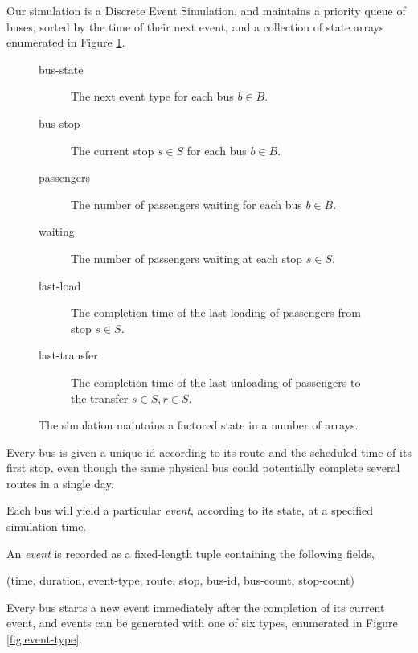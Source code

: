 \documentclass[12pt]{article}
\theoremstyle{definition}
\begin{document}
Our simulation is a Discrete Event Simulation, and maintains a priority queue
of buses, sorted by the time of their next event, and a collection of state
arrays enumerated in Figure \ref{fig:state}.

\begin{figure}
\caption{The simulation maintains a factored state in a number of arrays.}
\begin{description}
    \item[\ttfamily bus-state] The next event type for each bus $b \in B$.
    \item[\ttfamily bus-stop] The current stop $s \in S$ for each bus $b \in
        B$.
    \item[\ttfamily passengers] The number of passengers waiting
        for each bus $b \in B$.

    \item[\ttfamily waiting] The number of passengers waiting at each stop $s
        \in S$.

    \item[\ttfamily last-load] The completion time of the last loading of
        passengers from stop $s \in S$.

    \item[\ttfamily last-transfer] The completion time of the last unloading
        of passengers to the transfer $s \in S, r \in S$.
\end{description}
\label{fig:state}
\end{figure}

Every bus is given a unique id according to its route and the scheduled time
of its first stop, even though the same physical bus could potentially
complete several routes in a single day.

Each bus will yield a particular \emph{event}, according to its state, at a
specified simulation time.

An \emph{event} is recorded as a fixed-length tuple containing the following
fields,
{

    \centering\ttfamily
    (time, duration, event-type, route, stop, bus-id, bus-count, stop-count)

}

Every bus starts a new event immediately after the completion of its current
event, and events can be generated with one of six types, enumerated in Figure
\ref{fig:event-type}.
\end{document}
